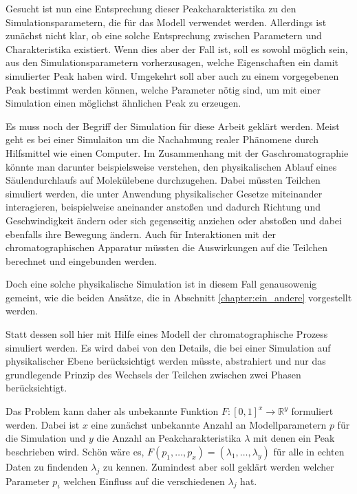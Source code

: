 Gesucht ist nun eine Entsprechung dieser Peakcharakteristika
zu den Simulationsparametern, die für das Modell verwendet werden. Allerdings ist zunächst nicht klar, ob eine solche Entsprechung zwischen Parametern und Charakteristika existiert. Wenn dies aber der Fall ist,  
soll es sowohl möglich sein, aus den Simulationsparametern vorherzusagen, welche Eigenschaften ein damit simulierter Peak haben wird. Umgekehrt soll aber auch zu einem vorgegebenen Peak bestimmt werden können, welche Parameter nötig sind, um mit einer Simulation einen möglichst ähnlichen Peak zu erzeugen.

Es muss noch der Begriff der Simulation für diese Arbeit geklärt werden. Meist geht es bei einer Simulaiton um die Nachahmung realer Phänomene durch Hilfsmittel wie einen Computer. Im Zusammenhang mit der Gaschromatographie könnte man darunter beispielsweise verstehen, den physikalischen Ablauf eines Säulendurchlaufs auf Molekülebene durchzugehen. Dabei müssten Teilchen simuliert werden, die unter Anwendung physikalischer Gesetze miteinander interagieren, beispielweise aneinander anstoßen und dadurch Richtung und Geschwindigkeit ändern oder sich gegenseitig anziehen oder abstoßen und dabei ebenfalls ihre Bewegung ändern. Auch für Interaktionen mit der chromatographischen Apparatur müssten die Auswirkungen auf die Teilchen berechnet und eingebunden werden. 

Doch eine solche physikalische Simulation ist in diesem Fall genausowenig gemeint, wie die beiden Ansätze, die in Abschnitt \ref{chapter:ein_andere} vorgestellt werden.

Statt dessen soll hier mit Hilfe eines Modell der chromatographische Prozess simuliert werden. Es wird dabei von den Details, die bei einer Simulation auf physikalischer Ebene berücksichtigt werden müsste, abstrahiert und nur das grundlegende Prinzip des Wechsels der Teilchen zwischen zwei Phasen berücksichtigt. 

Das Problem kann daher als unbekannte Funktion $F: [0,1] ^ x \rightarrow \mathbb{R}^y$ formuliert werden. Dabei ist $x$ eine zunächst unbekannte Anzahl an Modellparametern $p$ für die Simulation und $y$ die Anzahl an Peakcharakteristika $\lambda$ mit denen ein Peak beschrieben wird. Schön wäre es, $F(p_1, \ldots, p_x) = (\lambda_1, \ldots, \lambda_y)$ für alle in echten Daten zu findenden $\lambda_j$ zu kennen. Zumindest aber soll geklärt werden welcher Parameter $p_i$ welchen Einfluss auf die verschiedenen $\lambda_j$ hat. 

